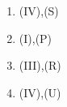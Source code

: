 \documentclass[journal,12pt,twocolumn]{IEEEtran}
\theoremstyle{remark}
\begin{document}
\begin{enumerate}
\begin{enumerate}[label=(\alph*)] 
 \item (IV),(S)
 \item (I),(P)
 \item (III),(R)    
 \item (IV),(U)

  
  \end{enumerate}
  \end{enumerate}
 
 
\end{document}
